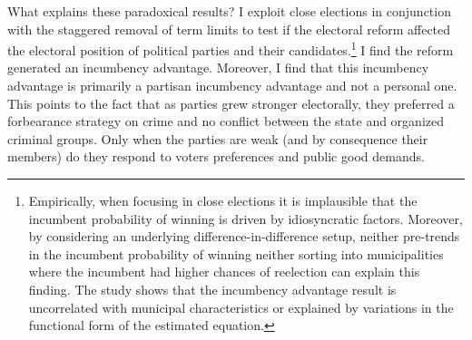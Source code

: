 \documentclass[12pt]{amsart}
\numberwithin{equation}{section}
\theoremstyle{definition}
\theoremstyle{definition}
\theoremstyle{definition}
\begin{document}
What explains these paradoxical results? I exploit close elections in conjunction with the staggered removal of term limits to test if the electoral reform affected the electoral position of political parties and their candidates.\footnote{Empirically, when focusing in close elections it is implausible that the incumbent probability of winning is driven by idiosyncratic factors. Moreover, by considering an underlying difference-in-difference setup, neither pre-trends in the incumbent probability of winning neither sorting into municipalities where the incumbent had higher chances of reelection can explain this finding. The study shows that the incumbency advantage result is uncorrelated with municipal characteristics or explained by variations in the functional form of the estimated equation.} I find the reform generated an incumbency advantage. Moreover, I find that this incumbency advantage is primarily a partisan incumbency advantage and not a personal one. This points to the fact that as parties grew stronger electorally, they preferred a forbearance strategy on crime and no conflict between the state and organized criminal groups. Only when the parties are weak (and by consequence their members)  do they  respond to voters preferences and public good demands. 


 
\end{document}
